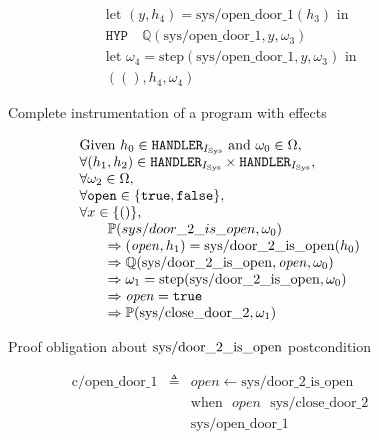 \begin{figure}
\[\begin{array}{rcl}
      &
      & \text{let }(y, h_4) = \mathrm{sys/open\_door\_1}(h_3) \text{ in} \\

      &
      & \mathtt{HYP} \quad \mathbb{Q}(\mathrm{sys/open\_door\_1}, y, \omega_3) \\

      &
      & \text{let }\omega_4 = \mathrm{step}(\mathrm{sys/open\_door\_1}, y, \omega_3) \text{ in} \\

      &
      & ((), h_4, \omega_4)
    \end{array}
  \]
  \caption{Complete instrumentation of a program with effects}
  \label{fig:freespec:instrumentation}
\end{figure}

\begin{figure}
  \centering
  \[
    \begin{array}{l}
      \text{Given }h_0 \in \mathtt{HANDLER}_{I_{\mathrm{Sys}}} \text{ and }
      \omega_0 \in \Omega, \\
      \forall (h_1, h_2) \in \mathtt{HANDLER}_{I_{\mathrm{Sys}}} \times \mathtt{HANDLER}_{I_{\mathrm{Sys}}}, \\
      \forall \omega_2 \in \Omega, \\
      \forall \mathtt{open} \in \{ \mathtt{true}, \mathtt{false} \}, \\
      \forall x \in \{()\}, \\
      \qquad\mathbb{P}(sys/door\_2\_is\_open, \omega_0) \\
      \qquad\Rightarrow (\mathit{open}, h_1) = \mathrm{sys/door\_2\_is\_open}(h_0) \\
      \qquad\Rightarrow \mathbb{Q}(\mathrm{sys/door\_2\_is\_open}, \mathit{open}, \omega_0) \\
      \qquad\Rightarrow \omega_1 = \mathrm{step}(\mathrm{sys/door\_2\_is\_open}, \omega_0) \\
      \qquad\Rightarrow \mathit{open} = \mathtt{true} \\
      \qquad\Rightarrow \mathbb{P}(\mathrm{sys/close\_door\_2}, \omega_1) \\
    \end{array}
  \]

  \caption{Proof obligation about $\mathrm{sys/door\_2\_is\_open}$ postcondition}
  \label{fig:freespec:proofobligation}
\end{figure}

\[
  \begin{array}{rcl}
    \mathrm{c/open\_door\_1}
    & \triangleq
    & open \leftarrow \mathrm{sys/door\_2\_is\_open} \\

    &
    & \mathrm{when} \text{ } \mathit{open} \text{ } \mathrm{sys/close\_door\_2} \\

    &
    & \mathrm{sys/open\_door\_1}
  \end{array}
\]

